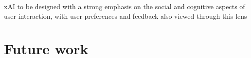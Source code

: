 xAI to be designed with a strong emphasis on the social and cognitive aspects of user interaction, with user preferences and feedback also viewed through this lens



\section{Future work}
\label{sec:FutureWork}


